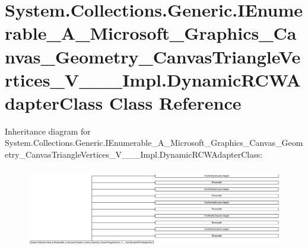 \hypertarget{class_system_1_1_collections_1_1_generic_1_1_i_enumerable___a___microsoft___graphics___canvas___942a9164794029c2ebfaf57749922090}{}\section{System.\+Collections.\+Generic.\+I\+Enumerable\+\_\+\+A\+\_\+\+Microsoft\+\_\+\+Graphics\+\_\+\+Canvas\+\_\+\+Geometry\+\_\+\+Canvas\+Triangle\+Vertices\+\_\+\+V\+\_\+\+\_\+\+\_\+\+Impl.\+Dynamic\+R\+C\+W\+Adapter\+Class Class Reference}
\label{class_system_1_1_collections_1_1_generic_1_1_i_enumerable___a___microsoft___graphics___canvas___942a9164794029c2ebfaf57749922090}
Inheritance diagram for System.\+Collections.\+Generic.\+I\+Enumerable\+\_\+\+A\+\_\+\+Microsoft\+\_\+\+Graphics\+\_\+\+Canvas\+\_\+\+Geometry\+\_\+\+Canvas\+Triangle\+Vertices\+\_\+\+V\+\_\+\+\_\+\+\_\+\+Impl.\+Dynamic\+R\+C\+W\+Adapter\+Class\+:\begin{figure}[H]
\begin{center}
\leavevmode
\includegraphics[height=3.610785cm]{class_system_1_1_collections_1_1_generic_1_1_i_enumerable___a___microsoft___graphics___canvas___942a9164794029c2ebfaf57749922090}
\end{center}
\end{figure}
